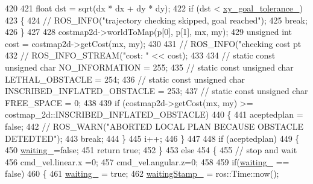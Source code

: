 \begin{DoxyCode}
{420 
421         \textcolor{keywordtype}{float} dst = sqrt(dx * dx + dy * dy);
422         \textcolor{keywordflow}{if} (dst < \hyperlink{classcl__move__base__z_1_1forward__local__planner_1_1ForwardLocalPlanner_acd2ed91ee166f03faeeb9d6a4b91084b}{xy\_goal\_tolerance\_})
423          \{
424             \textcolor{comment}{//  ROS\_INFO("trajectory checking skipped, goal reached");}
425              \textcolor{keywordflow}{break};
426         \}
427 
428         costmap2d->worldToMap(p[0], p[1], mx, my);
429         \textcolor{keywordtype}{unsigned} \textcolor{keywordtype}{int} cost = costmap2d->getCost(mx, my);
430 
431         \textcolor{comment}{// ROS\_INFO("checking cost pt %
432         \textcolor{comment}{// ROS\_INFO\_STREAM("cost: " << cost);}
433 
434         \textcolor{comment}{// static const unsigned char NO\_INFORMATION = 255;}
435         \textcolor{comment}{// static const unsigned char LETHAL\_OBSTACLE = 254;}
436         \textcolor{comment}{// static const unsigned char INSCRIBED\_INFLATED\_OBSTACLE = 253;}
437         \textcolor{comment}{// static const unsigned char FREE\_SPACE = 0;}
438 
439         \textcolor{keywordflow}{if} (costmap2d->getCost(mx, my) >= costmap\_2d::INSCRIBED\_INFLATED\_OBSTACLE)
440         \{
441             aceptedplan = \textcolor{keyword}{false};
442             \textcolor{comment}{// ROS\_WARN("ABORTED LOCAL PLAN BECAUSE OBSTACLE DETEDTED");}
443             \textcolor{keywordflow}{break};
444         \}
445         i++;
446     \}
447 
448     \textcolor{keywordflow}{if} (aceptedplan)
449     \{
450         \hyperlink{classcl__move__base__z_1_1forward__local__planner_1_1ForwardLocalPlanner_a5061c2aa0d8d2309f1669e402741f0fa}{waiting\_}=\textcolor{keyword}{false};
451         \textcolor{keywordflow}{return} \textcolor{keyword}{true};
452     \}
453     \textcolor{keywordflow}{else}
454     \{
455         \textcolor{comment}{// stop and wait}
456         cmd\_vel.linear.x =0;
457         cmd\_vel.angular.z=0;
458 
459         \textcolor{keywordflow}{if}(\hyperlink{classcl__move__base__z_1_1forward__local__planner_1_1ForwardLocalPlanner_a5061c2aa0d8d2309f1669e402741f0fa}{waiting\_} == \textcolor{keyword}{false})
460         \{
461             \hyperlink{classcl__move__base__z_1_1forward__local__planner_1_1ForwardLocalPlanner_a5061c2aa0d8d2309f1669e402741f0fa}{waiting\_} = \textcolor{keyword}{true};
462             \hyperlink{classcl__move__base__z_1_1forward__local__planner_1_1ForwardLocalPlanner_a85799b3050ae9125ee74c46c38cb2267}{waitingStamp\_} = ros::Time::now();
}}
\end{DoxyCode}
